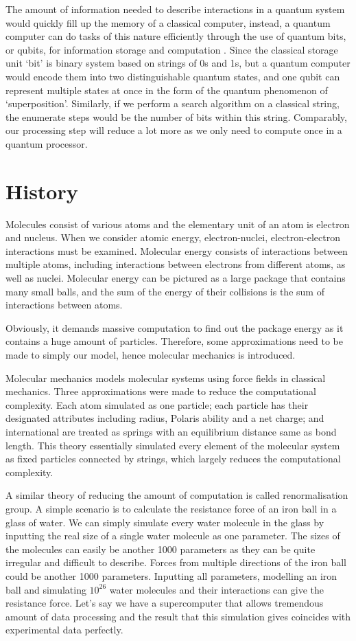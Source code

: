 \documentclass[12pt]{article}
\begin{document}
The amount of information needed to describe interactions in a quantum system would quickly fill up the memory of a classical computer, instead,
a quantum computer can do tasks of this nature efficiently through the use of quantum bits, or qubits, for information storage and computation
\cite{trabesinger2012quantum}. Since the classical storage unit ‘bit’ is binary system based on strings of 0s and 1s, but a quantum computer would
encode them into two distinguishable quantum states, and one qubit can represent multiple states at once in the form of the quantum phenomenon of
‘superposition’. Similarly, if we perform a search algorithm on a classical string, the enumerate steps would be the number of bits within this
string. Comparably, our processing step will reduce a lot more as we only need to compute once in a quantum processor.

\section{History}
Molecules consist of various atoms and the elementary unit of an atom is electron and nucleus. When we consider atomic energy, electron-nuclei,
electron-electron interactions must be examined. Molecular energy consists of interactions between multiple atoms, including interactions between
 electrons from different atoms, as well as nuclei. Molecular energy can be pictured as a large package that contains many small balls, and the
 sum of the energy of their collisions is the sum of interactions between atoms.

Obviously, it demands massive computation to find out the package energy as it contains a huge amount of particles. Therefore, some approximations
 need to be made to simply our model, hence molecular mechanics is introduced.

Molecular mechanics models molecular systems using force fields in classical mechanics. Three approximations were made to reduce the computational
 complexity. Each atom simulated as one particle; each particle has their designated attributes including radius, Polaris ability and a net charge;
  and international are treated as springs with an equilibrium distance same as bond length. This theory essentially simulated every element of the
   molecular system as fixed particles connected by strings, which largely reduces the computational complexity.

A similar theory of reducing the amount of computation is called renormalisation group. A simple scenario is to calculate the resistance force of an
 iron ball in a glass of water. We can simply simulate every water molecule in the glass by inputting the real size of a single water molecule as one
  parameter. The sizes of the molecules can easily be another 1000 parameters as they can be quite irregular and difficult to describe. Forces from
  multiple directions of the iron ball could be another 1000 parameters. Inputting all parameters, modelling an iron ball and simulating $10^{26}$
  water molecules and their interactions can give the resistance force. Let’s say we have a supercomputer that allows tremendous amount of data
  processing and the result that this simulation gives coincides with experimental data perfectly.
\end{document}
